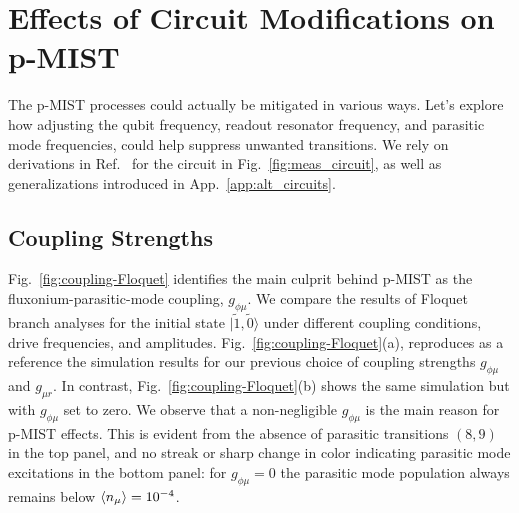 \documentclass[%
reprint,
superscriptaddress,
 amsmath,amssymb,
 aps,
 prx,
longbibliography,
floatfix,
]{revtex4-2}
\begin{document}
\section{Effects of Circuit Modifications on p-MIST}\label{sec:expressions}
The p-MIST processes could actually be mitigated in various ways. Let's explore how adjusting the qubit frequency, readout resonator frequency, and parasitic mode frequencies, could help suppress unwanted transitions. We rely on derivations in Ref.~\cite{viola2015collective} for the circuit in Fig.~\ref{fig:meas_circuit}, as well as generalizations introduced in App.~\ref{app:alt_circuits}.



\subsection{Coupling Strengths} \label{sec:coupling}

Fig.~\ref{fig:coupling-Floquet} identifies the main culprit behind p-MIST as the fluxonium-parasitic-mode coupling, $g_{\phi \mu}$. We compare the results of Floquet branch analyses for the initial state $|\tilde{1}, \tilde{0}\rangle$ under different coupling conditions, drive frequencies, and amplitudes. Fig.~\ref{fig:coupling-Floquet}(a), reproduces as a reference the simulation results for our previous choice of coupling strengths $g_{\phi\mu}$ and $g_{\mu r}$. In contrast, Fig.~\ref{fig:coupling-Floquet}(b) shows the same simulation but with $g_{\phi \mu}$ set to zero. We observe that a non-negligible $g_{\phi\mu}$ is the main reason for p-MIST effects. This is evident from the absence of parasitic transitions $(8,9)$ in the top panel, and no streak or sharp change in color indicating parasitic mode excitations in the bottom panel:  for $g_{\phi \mu}=0$ the parasitic mode population always remains below $\braket{n_\mu}=10^{-4}$. 
\end{document}
